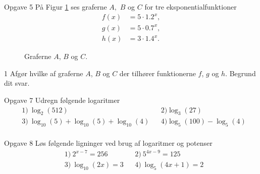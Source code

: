 \documentclass[12pt,x11names,a4paper]{article}
\begin{document}
\begin{opgavetekst}{Opgave 5}
	På Figur \ref{fig:grafer} ses graferne $A,$ $B$ og $C$ for tre eksponentialfunktioner
	\begin{align*}
		f(x) &= 5\cdot 1.2^x,\\
		g(x) &= 5 \cdot 0.7^x,  \\
		h(x) &= 3 \cdot 1.4^x.
	\end{align*}
	\begin{figure}[H]
		\centering
		\caption{Graferne $A$, $B$ og $C$.}
		\label{fig:grafer}
	\end{figure}
	\phantom{h}
\end{opgavetekst}
\begin{delopgave}{}{1}
	Afgør hvilke af graferne $A$, $B$ og $C$ der tilhører funktionerne $f$, $g$ og $h$. Begrund dit svar.
\end{delopgave}

\begin{opgavetekst}{Opgave 7}
	Udregn følgende logaritmer
	\begin{align*}
		&1) \  \log_2(512)  &   &2) \log_3(27) \\
		&3) \  \log_{10}(5) + \log_{10}(5) + \log_{10}(4)  &   &4) \log_5(100) - \log_5(4) \\
	\end{align*}
\end{opgavetekst}

\begin{opgavetekst}{Opgave 8}
	Løs følgende ligninger ved brug af logaritmer og potenser
	\begin{align*}
		&1) \ 2^{x-7} = 256 &   &2) \ 5^{4x-9} = 125\\
		&3) \ \log_{10}(2x) = 3 &   &4) \ \log_{5}(4x+1) = 2\\
	\end{align*}
\end{opgavetekst}
\end{document}

